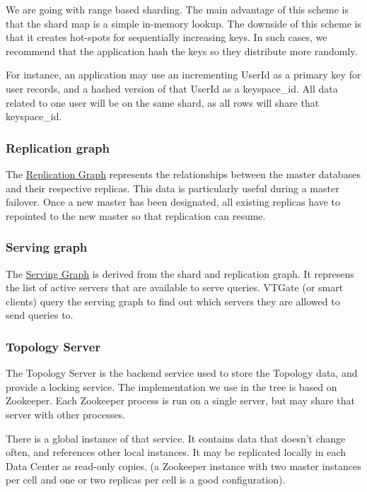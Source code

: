 We are going with range based sharding.
The main advantage of this scheme is that the shard map is a simple in-memory lookup.
The downside of this scheme is that it creates hot-spots for sequentially increasing keys.
In such cases, we recommend that the application hash the keys so they
distribute more randomly.

For instance, an application may use an incrementing UserId as a primary key for user records,
and a hashed version of that UserId as a keyspace\_id. All data related to one user will be on
the same shard, as all rows will share that keyspace\_id.

\subsubsection{Replication graph}\hypertarget{replication-graph}{}\label{replication-graph}

The \href{ReplicationGraph.markdown}{Replication Graph} represents the relationships between the master
databases and their respective replicas.
This data is particularly useful during a master failover.
Once a new master has been designated, all existing replicas have to
repointed to the new master so that replication can resume.

\subsubsection{Serving graph}\hypertarget{serving-graph}{}\label{serving-graph}

The \href{ServingGraph.markdown}{Serving Graph} is derived from the shard and replication graph.
It represens the list of active servers that are available to serve
queries.
VTGate (or smart clients) query the serving graph to find out which servers
they are allowed to send queries to.

\subsubsection{Topology Server}\hypertarget{topology-server}{}\label{topology-server}

The Topology Server is the backend service used to store the Topology data, and provide a locking service. The implementation we use in the tree is based on Zookeeper. Each Zookeeper process is run on a single server, but may share that server with other processes.

There is a global instance of that service. It contains data that doesn't change often, and references other local instances. It may be replicated locally in each Data Center as read-only copies. (a Zookeeper instance with two master instances per cell and one or two replicas per cell is a good configuration).

